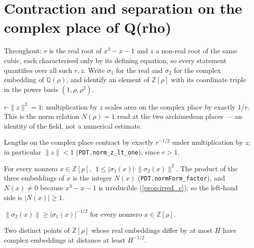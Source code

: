 \chapter{Contraction and separation on the complex place of Q(rho)}

Throughout: $r$ is the real root of $x^3-x-1$ and $z$ a non-real root of the same cubic,
each characterised only by its defining equation, so every statement quantifies over all
such $r,z$. Write $\sigma_1$ for the real and $\sigma_2$ for the complex embedding of
$\mathbb{Q}(\rho)$, and identify an element of $\mathbb{Z}[\rho]$ with its coordinate
triple in the power basis $(1,\rho,\rho^2)$.

\begin{theorem}
  \label{thm:tick_contraction}
  \leanok
  $r\cdot\|z\|^2 = 1$: multiplication by $z$ scales area on the complex place by exactly
  $1/r$. This is the norm relation $N(\rho)=1$ read at the two archimedean places --- an
  identity of the field, not a numerical estimate.
\end{theorem}

\begin{theorem}[Rate form: $\|z\| = r^{-1/2}$]
  \label{thm:norm_z_rpow}
  \leanok
  Lengths on the complex place contract by exactly $r^{-1/2}$ under multiplication by $z$;
  in particular $\|z\| < 1$ (\lstinline{PDT.norm_z_lt_one}), since $r > 1$.
\end{theorem}

\begin{theorem}
  \label{thm:meyer_separation}
  \leanok
  For every nonzero $x \in \mathbb{Z}[\rho]$, $\;1 \le |\sigma_1(x)|\cdot\|\sigma_2(x)\|^2$.
  The product of the three embeddings of $x$ is the integer $N(x)$
  (\lstinline{PDT.normForm_factor}), and $N(x) \neq 0$ because $x^3-x-1$ is irreducible
  (\cref{prop:irred_c}); so the left-hand side is $|N(x)| \ge 1$.
\end{theorem}

\begin{theorem}
  \label{thm:meyer_rpow}
  \leanok
  $\|\sigma_2(x)\| \ge |\sigma_1(x)|^{-1/2}$ for every nonzero $x \in \mathbb{Z}[\rho]$.
\end{theorem}

\begin{theorem}
  \label{thm:windowed_separation}
  \leanok
  Two distinct points of $\mathbb{Z}[\rho]$ whose real embeddings differ by at most $H$ have
  complex embeddings at distance at least $H^{-1/2}$.
\end{theorem}


